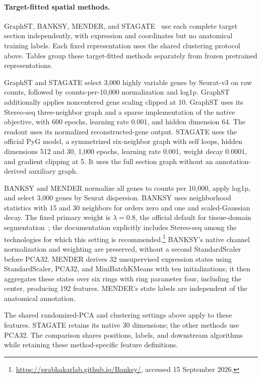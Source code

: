 \paragraph{Target-fitted spatial methods.}
GraphST, BANKSY, MENDER, and STAGATE~\citep{long2023graphst,singhal2024banksy,yuan2024mender,dong2022stagate} use each complete target section independently, with expression and coordinates but no anatomical training labels. Each fixed representation uses the shared clustering protocol above. Tables group these target-fitted methods separately from frozen pretrained representations.

GraphST and STAGATE select 3,000 highly variable genes by Seurat-v3 on raw counts, followed by counts-per-10,000 normalization and log1p. GraphST additionally applies noncentered gene scaling clipped at 10. GraphST uses its Stereo-seq three-neighbor graph and a sparse implementation of the native objective, with 600 epochs, learning rate 0.001, and hidden dimension 64. The readout uses its normalized reconstructed-gene output. STAGATE uses the official PyG model, a symmetrized six-neighbor graph with self loops, hidden dimensions 512 and 30, 1,000 epochs, learning rate 0.001, weight decay 0.0001, and gradient clipping at 5. It uses the full section graph without an annotation-derived auxiliary graph.

BANKSY and MENDER normalize all genes to counts per 10,000, apply log1p, and select 3,000 genes by Seurat dispersion. BANKSY uses neighborhood statistics with 15 and 30 neighbors for orders zero and one and scaled-Gaussian decay. The fixed primary weight is $\lambda=0.8$, the official default for tissue-domain segmentation~\citep{singhal2024banksy}; the documentation explicitly includes Stereo-seq among the technologies for which this setting is recommended.\footnote{\url{https://prabhakarlab.github.io/Banksy/}, accessed 15 September 2026.} BANKSY's native channel normalization and weighting are preserved, without a second StandardScaler before PCA32. MENDER derives 32 unsupervised expression states using StandardScaler, PCA32, and MiniBatchKMeans with ten initializations; it then aggregates these states over six rings with ring parameter four, including the center, producing 192 features. MENDER's state labels are independent of the anatomical annotation.

The shared randomized-PCA and clustering settings above apply to these features. STAGATE retains its native 30 dimensions; the other methods use PCA32. The comparison shares positions, labels, and downstream algorithms while retaining these method-specific feature definitions.

